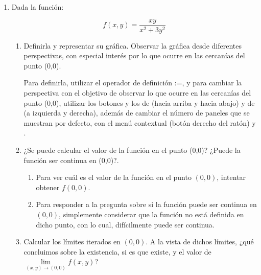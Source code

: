 \begin{enumerate}[leftmargin=*]
\begin{enumerate}
\begin{indicacion}
{}
\end{indicacion}

\end{enumerate}

\item Dada la función:


\[
f(x,y) = \frac{{xy}} {{x^2  + 3y^2 }}
\]

\begin{enumerate}
  \item Definirla y representar su gráfica. Observar
  la gráfica desde diferentes perspectivas,
  con especial interés por lo que ocurre en las
  cercanías del punto (0,0).

\begin{indicacion}
{Para definirla, utilizar el operador de definición :=, y para
cambiar la perspectiva con el objetivo de observar lo que ocurre en
las cercanías del punto (0,0), utilizar los botones
 y los de  (hacia arriba y hacia
abajo) y de  (a izquierda y derecha), además de cambiar
el número de paneles que se muestran por defecto, con el menú
contextual (botón derecho del ratón) y .

}
\end{indicacion}

  \item ¿Se puede calcular el valor de la función en el punto
  (0,0)? ¿Puede la función ser continua en (0,0)?.

\begin{indicacion}
{

\begin{enumerate}

\item Para ver cuál es el valor de la función en el punto $(0,0)$,
intentar obtener $f(0,0)$.

\item Para responder a la pregunta sobre si la función puede ser
continua en $(0,0)$, simplemente considerar que la función no está
definida en dicho punto, con lo cual, difícilmente puede ser
continua.

\end{enumerate}

}
\end{indicacion}


  \item Calcular los límites iterados en $(0,0)$. A la vista de
  dichos límites, ¿qué concluimos sobre la existencia, si es que existe, y el valor
  de $\mathop {\lim }\limits_{\left( {x,y} \right) \to \left( {0,0}
  \right)} f\left( {x,y} \right)$?


\end{enumerate}
\end{enumerate}
